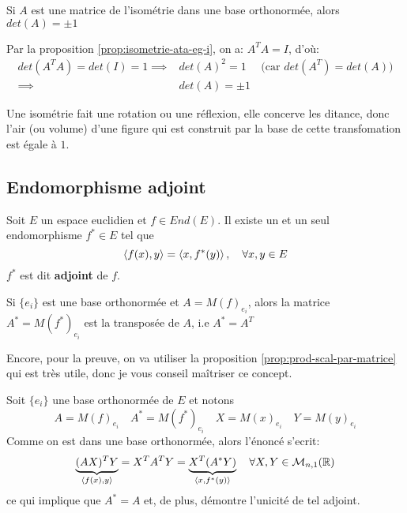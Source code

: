 \begin{prop}
   Si $A$ est une matrice de l'isométrie dans une base orthonormée, alors  $det(A) = \pm 1$ 
\end{prop}
\begin{preuve}
    Par la proposition \ref{prop:isometrie-ata-eg-i}, on a: $A^TA = I$, d'où:
     \begin{align*}
         det(A^TA) = det(I) = 1 \implies& det(A)^2 = 1 \quad \text{ (car }  det(A^T) = det(A) \text{)}\\
                                \implies& det(A) = \pm 1
    \end{align*}
\end{preuve}
\begin{intuition}
   Une isométrie fait une rotation ou une réflexion, elle concerve les ditance, donc l'air (ou volume) d'une figure qui est construit par la base de cette transfomation est égale à $1$. 
\end{intuition}

\subsection{Endomorphisme adjoint}
\begin{prop}
   Soit $E$ un espace euclidien et  $f \in End(E)$. Il existe un et un seul endomorphisme  $f^* \in E$ tel que
   \[
       \left\langle f(x), y \right\rangle = \left\langle x, f^*(y) \right\rangle, \quad \forall x, y \in E
   \] 
   $f^*$ est dit  \textbf{adjoint} de $f$.
   \par
   Si  $\{e_i\}$ est une base orthonormée et  $A = M(f)_{e_i}$, alors la matrice $A^* = M(f^*)_{e_i}$ est la transposée de $A$, i.e  $A^* = A^T$
\end{prop}
\begin{preuve}
    Encore, pour la preuve, on va utiliser la proposition \ref{prop:prod-scal-par-matrice} qui est très utile, donc je vous conseil maîtriser ce concept.
    \par
    Soit $\{e_i\}$ une base orthonormée de $E$ et notons
     \[
    A = M(f)_{e_i} \quad A^* = M(f^*)_{e_i} \quad X = M(x)_{e_i} \quad Y = M(y)_{e_i}
    \] 
    Comme on est dans une base orthonormée, alors l'énoncé s'ecrit:
    \[
        \underbrace{(AX)^TY}_{\left\langle f(x),y \right\rangle} = X^TA^TY = \underbrace{X^T(A^*Y)}_{\left\langle x, f^*(y) \right\rangle} \quad \forall X, Y \in \mathcal{M}_{n, 1}(\mathbb{R})
    \] 
    ce qui implique que $A^* = A$ et, de plus, démontre l'unicité de tel adjoint.
\end{preuve}


